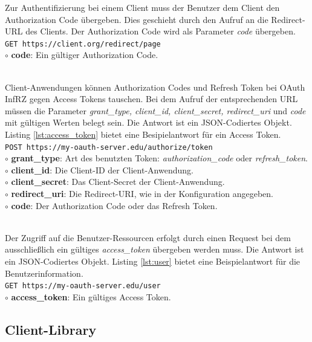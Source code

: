 \documentclass[12pt,a4paper,pointednumbers,abstracton]{scrartcl}
\newcommand{\code}[1]{\small\lstinline[style=InlinePHP]!#1!\normalsize}
\begin{document}
\begin{description}
		Zur Authentifizierung bei einem Client muss der Benutzer dem Client den Authorization Code übergeben.
		Dies geschieht durch den Aufruf an die Redirect-URL des Clients.
		Der Authorization Code wird als Parameter \emph{code} übergeben.\\
		\code{GET https://client.org/redirect/page}\\
		$\circ$ \textbf{code}: Ein gültiger Authorization Code.
	\newpage
	\item[Token-Austausch] \hfill \\
		Client-Anwendungen können Authorization Codes und Refresh Token bei OAuth InfRZ gegen Access Tokens tauschen.
		Bei dem Aufruf der entsprechenden URL müssen die Parameter \emph{grant\_type, client\_id, client\_secret, redirect\_uri} und \emph{code} mit gültigen Werten belegt sein.
		Die Antwort ist ein JSON-Codiertes Objekt.
		Listing \ref{lst:access_token} bietet eine Besipielantwort für ein Access Token.\\
		\code{POST https://my-oauth-server.edu/authorize/token}\\
		$\circ$ \textbf{grant\_type}: Art des benutzten Token: \emph{authorization\_code} oder \emph{refresh\_token}. \\
		$\circ$ \textbf{client\_id}: Die Client-ID der Client-Anwendung.\\
		$\circ$ \textbf{client\_secret}: Das Client-Secret der Client-Anwendung.\\
		$\circ$ \textbf{redirect\_uri}: Die Redirect-URI, wie in der Konfiguration angegeben.\\
		$\circ$ \textbf{code}: Der Authorization Code oder das Refresh Token.\\
	\item[Ressourcenzugriff] \hfill \\
		Der Zugriff auf die Benutzer-Ressourcen erfolgt durch einen Request bei dem ausschließlich ein gültiges \emph{access\_token} übergeben werden muss.
		Die Antwort ist ein JSON-Codiertes Objekt.
		Listing \ref{lst:user} bietet eine Beispielantwort für die Benutzerinformation.\\
		\code{GET https://my-oauth-server.edu/user}\\
		$\circ$ \textbf{access\_token}: Ein gültiges Access Token.
\end{description}

\subsection{Client-Library}
\label{sec:oauth-infrz/client}
\end{document}
